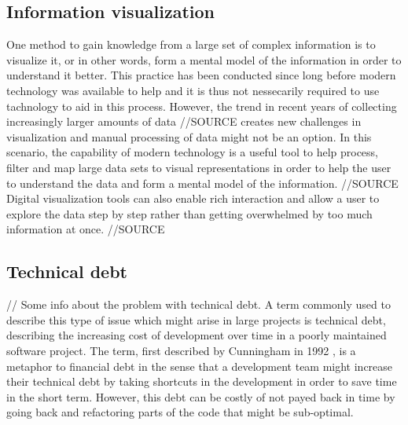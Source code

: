 \subsection{Information visualization}
One method to gain knowledge from a large set of complex information is to visualize it, or in other words, form a mental model of the information in order to understand it better. \cite{spence_information_2014}
This practice has been conducted since long before modern technology was available to help and it is thus not nessecarily required to use tachnology to aid in this process. \cite{friendly_brief_2008}
However, the trend in recent years of collecting increasingly larger amounts of data //SOURCE creates new challenges in visualization and manual processing of data might not be an option. 
In this scenario, the capability of modern technology is a useful tool to help process, filter and map large data sets to visual representations in order to help the user to understand the data and form a mental model of the information. //SOURCE
Digital visualization tools can also enable rich interaction and allow a user to explore the data step by step rather than getting overwhelmed by too much information at once. //SOURCE


\subsection{Technical debt}
// Some info about the problem with technical debt.
A term commonly used to describe this type of issue which might arise in large projects is technical debt, describing the increasing cost of development over time in a poorly maintained software project. 
The term, first described by Cunningham in 1992 \cite{cunningham_wycash_1992}, is a metaphor to financial debt in the sense that a development team might increase their technical debt by taking shortcuts in the development in order to save time in the short term.
However, this debt can be costly of not payed back in time by going back and refactoring parts of the code that might be sub-optimal.
